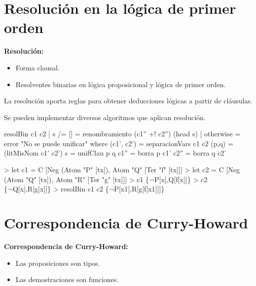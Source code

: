\documentclass[aspectratio=169]{beamer}
\begin{document}
\section{Resolución en la lógica de primer orden}
\begin{frame}
  \textbf{Resolución:}

  \begin{itemize}
  \item Forma clausal.
  \item Resolventes binarias en lógica proposicional y lógica de primer orden.
  \end{itemize}
  La resolución aporta reglas para obtener deducciones lógicas a partir de cláusulas.

  Se pueden implementar diversos algoritmos que aplican resolución.
\end{frame}

\begin{frame}[fragile]
\begin{code}
resolBin c1 c2 
    | s /= [] = renombramiento (c1'' +! c2'') (head s)
    | otherwise = error "No se puede unificar"
    where
      (c1', c2') = separacionVars c1 c2
      (p,q) = (litMisNom c1' c2')
      s = unifClau p q
      c1'' = borra p c1'
      c2'' = borra q c2'
\end{code}  
\end{frame}

\begin{frame}[fragile]
\begin{sesion}
> let c1 = C [Neg (Atom "P" [tx]), Atom "Q" [Ter "f" [tx]]]
> let c2 = C [Neg (Atom "Q" [tx]), Atom "R" [Ter "g" [tx]]]
> c1
\{¬P[x],Q[f[x]]\}
> c2
\{¬Q[x],R[g[x]]\}
> resolBin c1 c2
\{¬P[x1],R[g[f[x1]]]\}
\end{sesion}

\end{frame}
\section{Correspondencia de Curry-Howard}
\begin{frame}
  \textbf{Correspondencia de Curry-Howard:}
\vspace{5mm}
  \begin{itemize}
  \item Las proposiciones son tipos.
  \item Las demostraciones son funciones.
  \end{itemize}
\end{frame}
\end{document}
